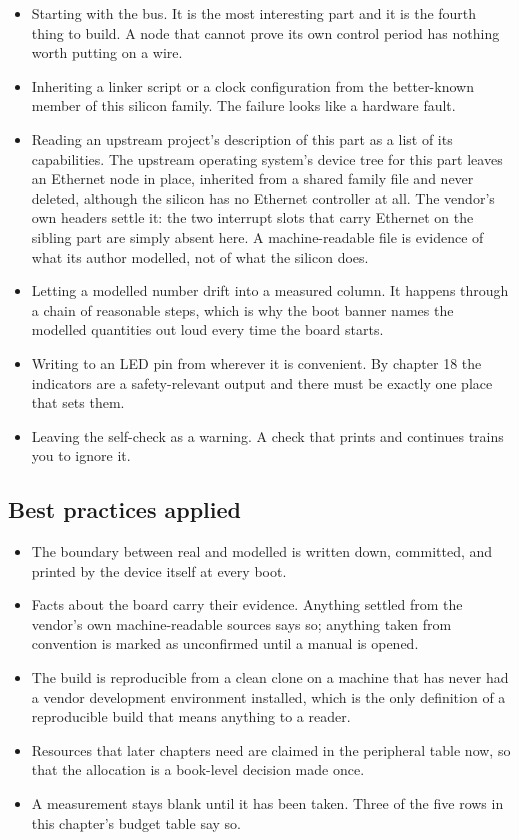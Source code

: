 \begin{itemize}
\item Starting with the bus. It is the most interesting part and it is the
fourth thing to build. A node that cannot prove its own control period has
nothing worth putting on a wire.
\item Inheriting a linker script or a clock configuration from the better-known
member of this silicon family. The failure looks like a hardware fault.
\item Reading an upstream project's description of this part as a list of its
capabilities. The upstream operating system's device tree for this part leaves
an Ethernet node in place, inherited from a shared family file and never
deleted, although the silicon has no Ethernet controller at all. The vendor's
own headers settle it: the two interrupt slots that carry Ethernet on the
sibling part are simply absent here. A machine-readable file is evidence of what
its author modelled, not of what the silicon does.
\item Letting a modelled number drift into a measured column. It happens through
a chain of reasonable steps, which is why the boot banner names the modelled
quantities out loud every time the board starts.
\item Writing to an LED pin from wherever it is convenient. By chapter 18 the
indicators are a safety-relevant output and there must be exactly one place that
sets them.
\item Leaving the self-check as a warning. A check that prints and continues
trains you to ignore it.
\end{itemize}

\subsection*{Best practices applied}

\begin{itemize}
\item The boundary between real and modelled is written down, committed, and
printed by the device itself at every boot.
\item Facts about the board carry their evidence. Anything settled from the
vendor's own machine-readable sources says so; anything taken from convention is
marked as unconfirmed until a manual is opened.
\item The build is reproducible from a clean clone on a machine that has never
had a vendor development environment installed, which is the only definition of
a reproducible build that means anything to a reader.
\item Resources that later chapters need are claimed in the peripheral table
now, so that the allocation is a book-level decision made once.
\item A measurement stays blank until it has been taken. Three of the five rows
in this chapter's budget table say so.
\end{itemize}

